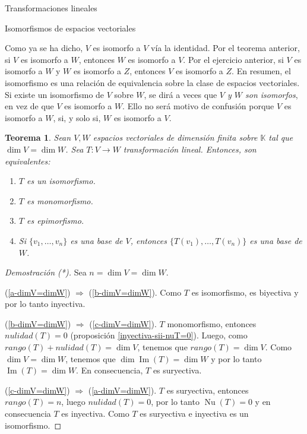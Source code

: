 \documentclass[a4paper,12pt,twoside,spanish,reqno]{amsbook}
\newtheorem{teorema}{Teorema}[section]
\theoremstyle{definition}
\theoremstyle{remark}
\newcommand{\img}{\operatorname{Im}}
\newcommand{\nuc}{\operatorname{Nu}}
\newcommand{\K}{\mathbb K}
\begin{document}
\begin{chapter}{Transformaciones lineales}
\begin{section}{Isomorfismos de espacios vectoriales}
        
        Como ya se ha dicho, $V$ es isomorfo a $V$ vía la identidad. Por  el teorema anterior, si $V$ es isomorfo a $W$,  entonces $W$ es isomorfo a $V$. Por  el ejercicio anterior, si $V$ es isomorfo a $W$ y $W$ es isomorfo a $Z$, entonces $V$ es isomorfo a $Z$. En resumen, el isomorfismo es una relación de equivalencia sobre la clase de espacios vectoriales. Si existe un isomorfismo de $V$ sobre $W$, se dirá a veces que \textit{$V$ y $W$ son isomorfos}, en vez de que $V$ es isomorfo a $W$. Ello no será motivo de confusión porque $V$ es isomorfo a $W$, si, y solo si, $W$ es isomorfo a $V$.	
            
        
            
            
        \begin{teorema}
            Sean $V,W$ espacios vectoriales de dimensión  finita sobre $\K$ tal que $\dim V = \dim W$. Sea $T: V \to W$ transformación lineal. Entonces,  son equivalentes:
            \begin{enumerate}[label=(\alph*),ref=\alph*]
                \item\label{a-dimV=dimW} $T$ es un  isomorfismo.
                \item\label{b-dimV=dimW} $T$ es monomorfismo.
                \item\label{c-dimV=dimW} $T$ es epimorfismo.
                \item\label{d-dimV=dimW} Si $\{v_1,\ldots,v_n \}$ es una base de $V$,  entonces $\{T(v_1),\ldots,T(v_n) \}$ es una base de $W$.
            \end{enumerate}
        \end{teorema}
        \begin{proof}[Demostración (*)] Sea $n = \dim V = \dim W$.
            
            
            (\ref{a-dimV=dimW}) $\Rightarrow$ (\ref{b-dimV=dimW}). Como $T$ es isomorfismo,  es biyectiva y por lo tanto inyectiva.
            
            (\ref{b-dimV=dimW}) $\Rightarrow$ (\ref{c-dimV=dimW}). $T$ monomorfismo,  entonces $nulidad(T) = 0$ (proposición \ref{inyectiva-sii-nuT=0}). Luego, como  $rango(T) +nulidad(T) = \dim V$,  tenemos que $rango(T) = \dim V$. Como $\dim V = \dim W$, tenemos que $\dim \img(T) = \dim W$ y por lo tanto $\img(T) = \dim W$. En  consecuencia, $T$ es suryectiva.
            
            (\ref{c-dimV=dimW}) $\Rightarrow$ (\ref{a-dimV=dimW}). $T$ es suryectiva, entonces $rango(T) = n$, luego  $nulidad(T) = 0$, por lo tanto $\nuc(T)=0$ y en consecuencia $T$ es inyectiva. Como $T$ es suryectiva e inyectiva  es un isomorfismo. 
            

\end{proof}
\end{section}
\end{chapter}
\end{document}
